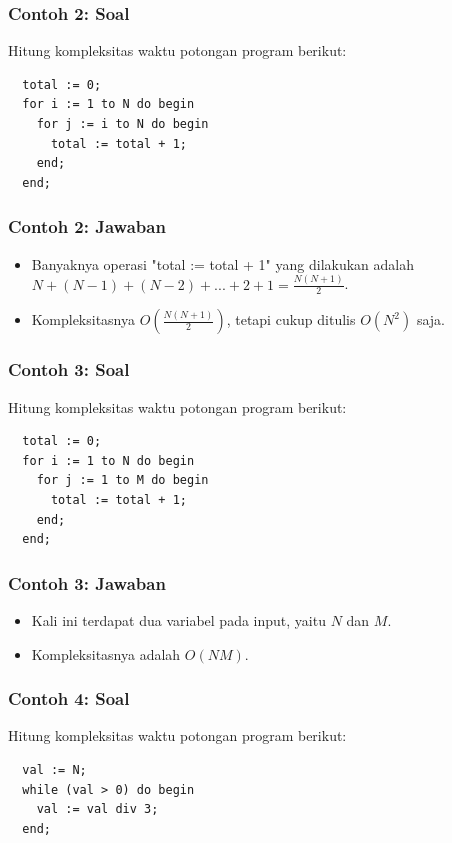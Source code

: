 \documentclass{beamer}
\begin{document}
\begin{frame}[fragile]
\frametitle{Contoh 2: Soal}
Hitung kompleksitas waktu potongan program berikut:

\hfill

\begin{lstlisting}
  total := 0;
  for i := 1 to N do begin
    for j := i to N do begin
      total := total + 1;
    end;
  end;
\end{lstlisting}
\end{frame}

\begin{frame}
\frametitle{Contoh 2: Jawaban}
\begin{itemize}
  \item Banyaknya operasi "total := total + 1" yang dilakukan adalah $N + (N-1) + (N-2) + ... + 2 + 1 = \frac{N(N+1)}{2}$.
  \item Kompleksitasnya $O \left( \frac{N(N+1)}{2} \right)$, tetapi cukup ditulis $O(N^2)$ saja.
\end{itemize}
\end{frame}

\begin{frame}[fragile]
\frametitle{Contoh 3: Soal}
Hitung kompleksitas waktu potongan program berikut:

\hfill

\begin{lstlisting}
  total := 0;
  for i := 1 to N do begin
    for j := 1 to M do begin
      total := total + 1;
    end;
  end;
\end{lstlisting}
\end{frame}

\begin{frame}
\frametitle{Contoh 3: Jawaban}
\begin{itemize}
  \item Kali ini terdapat dua variabel pada input, yaitu $N$ dan $M$.
  \item Kompleksitasnya adalah $O(NM)$.
\end{itemize}
\end{frame}

\begin{frame}[fragile]
\frametitle{Contoh 4: Soal}
Hitung kompleksitas waktu potongan program berikut:

\hfill

\begin{lstlisting}
  val := N;
  while (val > 0) do begin
    val := val div 3;
  end;
\end{lstlisting}
\end{frame}
\end{document}
